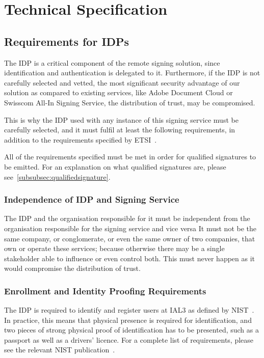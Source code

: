 \chapter{Technical Specification}\label{ch:technical-specification}
\section{Requirements for IDPs}\label{sec:requirements-for-idps}
The \gls{IDP} is a critical component of the remote signing solution,
since identification and authentication is delegated to it.
Furthermore, if the \gls{IDP} is not carefully selected and vetted,
the most significant security advantage of our solution as compared to existing services,
like Adobe Document Cloud or Swisscom All-In Signing Service,
the distribution of trust,
may be compromised.

This is why the \gls{IDP} used with any instance of this signing service must be carefully selected,
and it must fulfil at least the following requirements,
in addition to the requirements specified by \gls{ETSI}~\cite{etsicarequirements}.

All of the requirements specified must be met in order for qualified signatures to be emitted.
For an explanation on what qualified signatures are, please see~\ref{subsubsec:qualifiedsignature}.

\subsection{Independence of IDP and Signing Service}\label{subsec:organisational-and-financial-independence}
The \gls{IDP} and the organisation responsible for it must be independent from the organisation responsible for the signing service and vice versa
It must not be the same company, or conglomerate, or even the same owner of two companies,
that own or operate these services;
because otherwise there may be a single stakeholder able to influence or even control both.
This must never happen as it would compromise the distribution of trust.

\subsection{Enrollment and Identity Proofing Requirements}\label{subsec:enrollment-and-identity-proofing-requirements}
The \gls{IDP} is required to identify and register users at \gls{IAL3} as defined by \gls{NIST}~\cite{nistregister}.
In practice, this means that physical presence is required for identification,
and two pieces of strong physical proof of identification has to be presented,
such as a passport as well as a drivers' licence.
For a complete list of requirements, please see the relevant \gls{NIST} publication~\cite{nistregister}.

